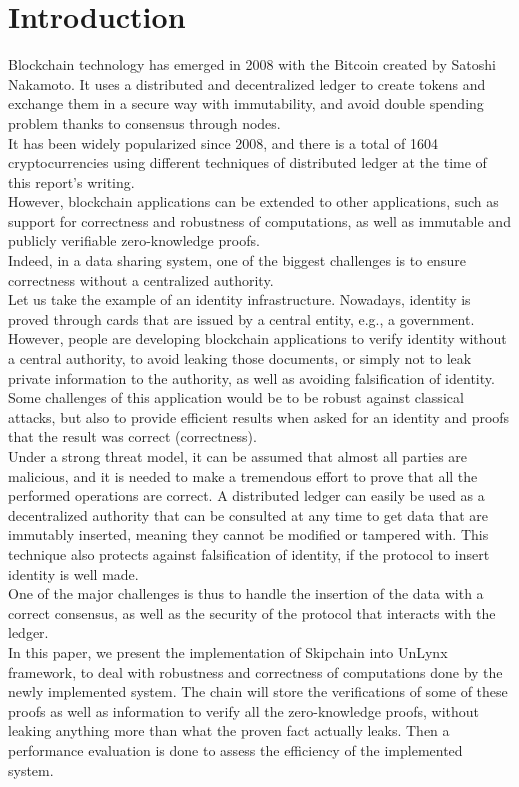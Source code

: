 \documentclass{article}
\begin{document}
\section{Introduction}
Blockchain \cite{bitcoin} technology has emerged in 2008 with the Bitcoin created by Satoshi Nakamoto. It uses a distributed and decentralized ledger to create tokens and exchange them in a secure way with immutability, and avoid double spending problem \cite{spending} thanks to consensus through nodes.\\
It has been widely popularized since 2008, and there is a total of 1604 cryptocurrencies \cite{coinmarket} using different techniques of distributed ledger at the time of this report's writing.\\
However, blockchain applications can be extended to other applications, such as support for correctness and robustness of computations, as well as immutable and publicly verifiable zero-knowledge proofs.\\
Indeed, in a data sharing system, one of the biggest challenges is to ensure correctness without a centralized authority.\\
Let us take the example of an identity infrastructure. Nowadays, identity is proved through cards that are issued by a central entity, e.g., a government. However, people are developing blockchain applications to verify identity without a central authority, to avoid leaking those documents, or simply not to leak private information to the authority, as well as avoiding falsification of identity.\\ 
Some challenges of this application would be to be robust against classical attacks, but also to provide efficient results when asked for an identity and proofs that the result was correct (correctness).\\
Under a strong threat model, it can be assumed that almost all parties are malicious, and it is needed to make a tremendous effort to prove that all the performed operations are correct. A distributed ledger can easily be used as a decentralized authority that can be consulted at any time to get data that are immutably inserted, meaning they cannot be modified or tampered with. This technique also protects against falsification of identity, if the protocol to insert identity is well made.\\
One of the major challenges is thus to handle the insertion of the data with a correct consensus, as well as the security of the protocol that interacts with the ledger.\\
In this paper, we present the implementation of Skipchain \cite{chainiac,skipchain} into UnLynx framework, to deal with robustness and correctness of computations done by the newly implemented system. The chain will store the verifications of some of these proofs as well as information to verify all the zero-knowledge proofs, without leaking anything more than what the proven fact actually leaks. Then a performance evaluation is done to assess the efficiency of the implemented system.
\end{document}
